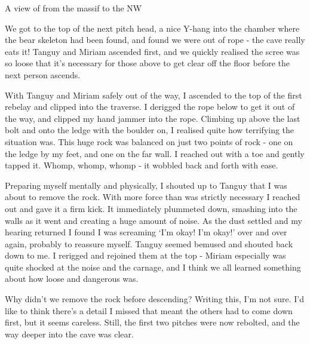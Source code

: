 \begin{marginfigure}
\caption{A view of \protect{} from the \protect{} massif to the NW }
\label{view}
\end{marginfigure}

We got to the top of the next pitch head, a nice Y-hang into the chamber where the bear skeleton had been found, and found we were out of rope - the cave really eats it! Tanguy and Miriam ascended first, and we quickly realised the scree was so loose that it's necessary for those above to get clear off the floor before the next person ascends.

With Tanguy and Miriam safely out of the way, I ascended to the top of the first rebelay and clipped into the traverse. I derigged the rope below to get it out of the way, and clipped my hand jammer into the rope. Climbing up above the last bolt and onto the ledge with the boulder on, I realised quite how terrifying the situation was. This huge rock was balanced on just two points of rock - one on the ledge by my feet, and one on the far wall. I reached out with a toe and gently tapped it. Whomp, whomp, whomp - it wobbled back and forth with ease. 

Preparing myself mentally and physically, I shouted up to Tanguy that I was about to remove the rock. With more force than was strictly necessary I reached out and gave it a firm kick. It immediately plummeted down, smashing into the walls as it went and creating a huge amount of noise. As the dust settled and my hearing returned I found I was screaming `I'm okay! I'm okay!' over and over again, probably to reassure myself. Tanguy seemed bemused and shouted back down to me. I rerigged and rejoined them at the top - Miriam especially was quite shocked at the noise and the carnage, and I think we all learned something about how loose and dangerous  was.

Why didn't we remove the rock before descending? Writing this, I'm not sure. I'd like to think there's a detail I missed that meant the others had to come down first, but it seems careless. Still, the first two pitches were now rebolted, and the way deeper into the cave was clear.

